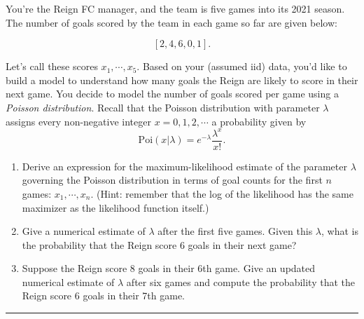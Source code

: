 \documentclass{article}
\begin{document}
\begin{aprob}
    You're the Reign FC manager, and the team is five games into its 2021 season. The number of goals scored by the team in each game so far are given below:

    \[
      [2, 4, 6, 0, 1].
    \]

    Let's call these scores $x_1, \cdots, x_5$. Based on your (assumed iid) data, you'd like to build a model to understand how many goals the Reign are likely to score in their next game. You decide to model the number of goals scored per game using a \emph{Poisson distribution}. Recall that the Poisson distribution with parameter $\lambda$ assigns every non-negative integer $x = 0, 1, 2, \cdots$ a probability given by
    \[
      \mathrm{Poi}(x | \lambda) = e^{-\lambda} \frac{\lambda ^ x}{x!}.
    \]

    \begin{enumerate}
        \item {} Derive an expression for the maximum-likelihood estimate of the parameter $\lambda$ governing the Poisson distribution in terms of goal counts for the first $n$ games: $x_1, \cdots, x_n$. (Hint: remember that the log of the likelihood has the same maximizer as the likelihood function itself.)

        \item {} Give a numerical estimate of $\lambda$ after the first five games. Given this $\lambda$, what is the probability that the Reign score $6$ goals in their next game?
        \item {} Suppose the Reign score 8 goals in their 6th game. Give an updated numerical estimate of $\lambda$ after six games and compute the probability that the Reign score $6$ goals in their 7th game.
    \end{enumerate}

    \rule{\textwidth}{0.25pt}


\end{aprob}
\end{document}
